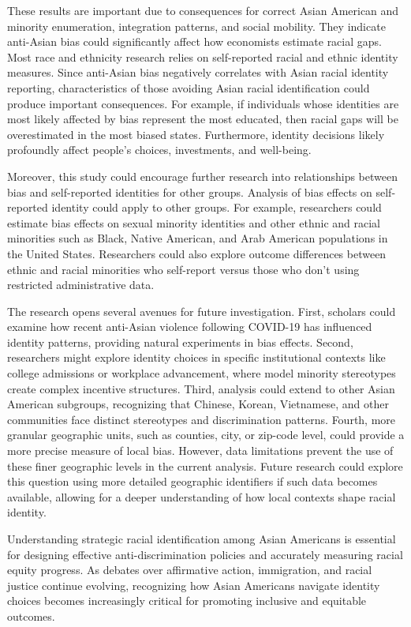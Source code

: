 These results are important due to consequences for correct Asian American and minority enumeration, integration patterns, and social mobility. They indicate anti-Asian bias could significantly affect how economists estimate racial gaps. Most race and ethnicity research relies on self-reported racial and ethnic identity measures. Since anti-Asian bias negatively correlates with Asian racial identity reporting, characteristics of those avoiding Asian racial identification could produce important consequences. For example, if individuals whose identities are most likely affected by bias represent the most educated, then racial gaps will be overestimated in the most biased states. Furthermore, identity decisions likely profoundly affect people's choices, investments, and well-being.

Moreover, this study could encourage further research into relationships between bias and self-reported identities for other groups. Analysis of bias effects on self-reported identity could apply to other groups. For example, researchers could estimate bias effects on sexual minority identities and other ethnic and racial minorities such as Black, Native American, and Arab American populations in the United States. Researchers could also explore outcome differences between ethnic and racial minorities who self-report versus those who don't using restricted administrative data.

The research opens several avenues for future investigation. First, scholars could examine how recent anti-Asian violence following COVID-19 has influenced identity patterns, providing natural experiments in bias effects. Second, researchers might explore identity choices in specific institutional contexts like college admissions or workplace advancement, where model minority stereotypes create complex incentive structures. Third, analysis could extend to other Asian American subgroups, recognizing that Chinese, Korean, Vietnamese, and other communities face distinct stereotypes and discrimination patterns. Fourth, more granular geographic units, such as counties, city, or zip-code level, could provide a more precise measure of local bias. However, data limitations prevent the use of these finer geographic levels in the current analysis. Future research could explore this question using more detailed geographic identifiers if such data becomes available, allowing for a deeper understanding of how local contexts shape racial identity.

Understanding strategic racial identification among Asian Americans is essential for designing effective anti-discrimination policies and accurately measuring racial equity progress. As debates over affirmative action, immigration, and racial justice continue evolving, recognizing how Asian Americans navigate identity choices becomes increasingly critical for promoting inclusive and equitable outcomes.